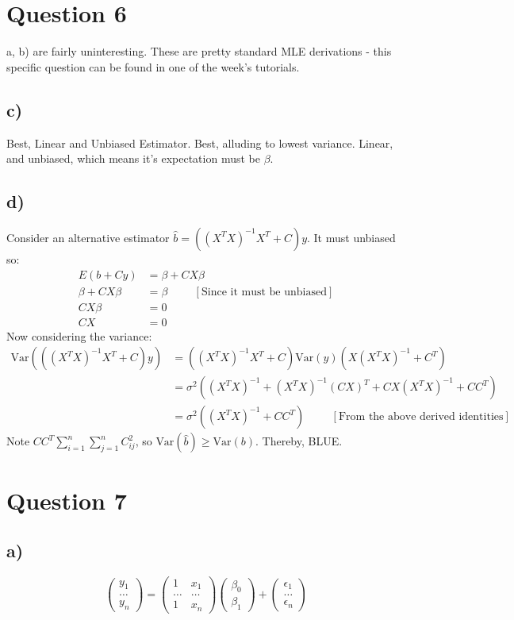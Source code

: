 \documentclass{article}
\begin{document}
\section*{Question 6}
a, b) are fairly uninteresting. These are pretty standard MLE derivations - this specific question 
can be found in one of the week's tutorials.

\subsection*{c)}
Best, Linear and Unbiased Estimator. Best, alluding to lowest variance. Linear, and unbiased, which means 
it's expectation must be $\beta$. 

\subsection*{d)}
Consider an alternative estimator $\hat{b} = ((X^TX)^{-1}X^T + C)y$. It must unbiased so: 
\begin{align*}
    E(b + Cy) &= \beta + CX\beta \\ 
    \beta + CX\beta &= \beta \hspace{1cm} [\text{Since it must be unbiased}] \\ 
    CX\beta &= 0 \\ 
    CX &= 0
\end{align*}
Now considering the variance:
\begin{align*}
    \text{Var}(((X^TX)^{-1}X^T + C)y) &= ((X^TX)^{-1}X^T + C)\text{Var}(y)(X(X^TX)^{-1} + C^T) \\ 
    &= \sigma^2((X^TX)^{-1} + (X^TX)^{-1}(CX)^T + CX(X^TX)^{-1} + CC^T) \\ 
    &= \sigma^2((X^TX)^{-1} + CC^T) \hspace{1cm} [\text{From the above derived identities}]
\end{align*}
Note $CC^T \sum_{i=1}^n\sum_{j=1}^n C_{ij}^2$, so $\text{Var}(\hat{b}) \ge \text{Var}(b)$. Thereby, BLUE.

\section*{Question 7}
\subsection*{a)}
$$ \begin{pmatrix}
    y_1 \\ \dots \\ y_n
\end{pmatrix} = 
\begin{pmatrix}
    1 & x_1 \\ 
    \dots & \dots \\ 
    1 & x_n
\end{pmatrix} 
\begin{pmatrix}
    \beta_0 \\ 
    \beta_1
\end{pmatrix} + 
\begin{pmatrix}
    \epsilon_1 \\ 
    \dots \\ 
    \epsilon_n
\end{pmatrix}
$$
\end{document}
